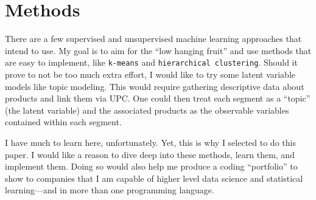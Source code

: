 \documentclass[12pt,letterpaperpaper,]{book}
\begin{document}
\hypertarget{methods}{\section*{Methods}\label{methods}}

There are a few supervised and unsupervised machine learning approaches
that intend to use. My goal is to aim for the ``low hanging fruit'' and
use methods that are easy to implement, like \texttt{k-means} and
\texttt{hierarchical\ clustering}. Should it prove to not be too much
extra effort, I would like to try some latent variable models like topic
modeling. This would require gathering descriptive data about products
and link them via UPC. One could then treat each segment as a ``topic''
(the latent variable) and the associated products as the observable
variables contained within each segment.

I have much to learn here, unfortunately. Yet, this is why I selected to
do this paper. I would like a reason to dive deep into these methods,
learn them, and implement them. Doing so would also help me produce a
coding ``portfolio'' to show to companies that I am capable of higher
level data science and statistical learning---and in more than one
programming language.



\backmatter
\printindex
\end{document}
